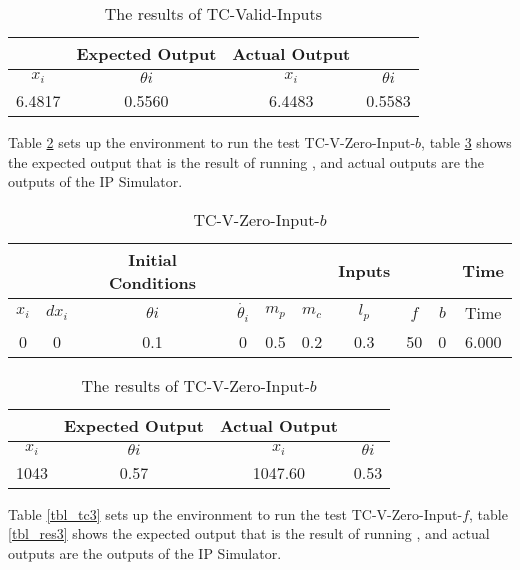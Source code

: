 \documentclass[12pt, titlepage]{article}
\begin{document}
\begin{table}[ht]
\caption{The results of TC-Valid-Inputs} \label{tbl_res1}
\vspace*{2mm}
\centering
 \begin{tabular}{|c c|c c|} 
 \hline
&\textbf{Expected Output}& \textbf{Actual Output} &  \\ \hline
$x_i$&$\theta{i}$ & $x_i$&$\theta{i}$  \\ \hline
6.4817 &0.5560&  6.4483 &0.5583\\
 \hline
\end{tabular}
\end{table}	
Table \ref{tbl_tc2} sets up the environment to run the test TC-V-Zero-Input-$b$, table \ref{tbl_res2} shows the expected output that is the result of running \cite{al-khazraji_2022}, and actual outputs are the outputs of the IP Simulator.\\
 
\begin{table}[h!]
\caption{TC-V-Zero-Input-$b$} \label{tbl_tc2}
\vspace*{2mm}
\centering
 \begin{tabular}{|c c c c|c c c c c|c|} 
 \hline
&&\textbf{Initial Conditions}& &  &  &  \textbf{Inputs} &  &&\textbf{Time}  \\ \hline
$x_i$&$dx_i$&$\theta{i}$&$\dot{\theta_{i}}$ & $m_p$ & $m_c$ & $l_p$ & $f$ & $b$  & Time \\ \hline
0 & 0 & 0.1 & 0 & 0.5 & 0.2 & 0.3 & 50 & 0 & 6.000\\
 \hline
\end{tabular}
\end{table}	

\begin{table}[h!]
\caption{The results of TC-V-Zero-Input-$b$} \label{tbl_res2}
\vspace*{2mm}
\centering
 \begin{tabular}{|c c|c c|} 
 \hline
&\textbf{Expected Output}& \textbf{Actual Output} &  \\ \hline
$x_i$&$\theta{i}$ & $x_i$&$\theta{i}$  \\ \hline
 1043 & 0.57 & 1047.60 & 0.53\\
 \hline
\end{tabular}
\end{table}	
Table \ref{tbl_tc3} sets up the environment to run the test TC-V-Zero-Input-$f$, table \ref{tbl_res3} shows the expected output that is the result of running \cite{al-khazraji_2022}, and actual outputs are the outputs of the IP Simulator.\\
\end{document}
